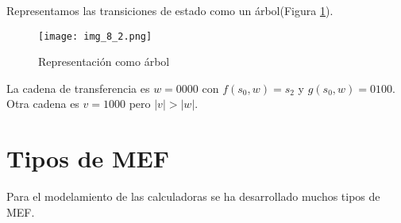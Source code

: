 Representamos las transiciones de estado como un árbol(Figura \ref{img_8_2}).

\begin{figure}[h!]
\centering
\texttt{[image: img\_8\_2.png]}
\caption{Representación como árbol}\label{img_8_2}
\end{figure}

La cadena de transferencia es $w=0000$ con $f(s_0,w)=s_2$ y $g(s_0,w)=0100$. Otra cadena es $v=1000$ pero $|v|>|w|$.

\section{Tipos de MEF}

Para el modelamiento de las calculadoras se ha desarrollado muchos tipos de MEF.


